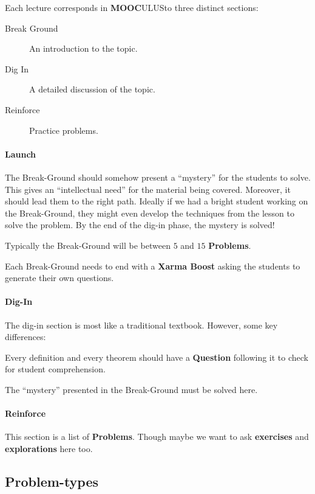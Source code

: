 \documentclass{article}
\newcommand{\mooculus}{\textsf{\textbf{MOOC}\textnormal{\textsf{ULUS}}}}
\begin{document}
Each lecture corresponds in \mooculus to three distinct sections:
\begin{description}
\item[Break Ground] An introduction to the topic.
\item[Dig In] A detailed discussion of the topic.
\item[Reinforce] Practice problems.
\end{description}

\paragraph{Launch}

The Break-Ground should somehow present a ``mystery'' for the students
to solve.  This gives an ``intellectual need'' for the material being
covered. Moreover, it should lead them to the right path. Ideally if
we had a bright student working on the Break-Ground, they might even develop
the techniques from the lesson to solve the problem.  By the end of
the dig-in phase, the mystery is solved!

Typically the Break-Ground will be between $5$ and $15$ \textbf{Problems}.

Each Break-Ground needs to end with a \textbf{Xarma Boost} asking the
students to generate their own questions.


\paragraph{Dig-In}


The dig-in section is most like a traditional textbook. However, some key differences:


Every definition and every theorem should have a \textbf{Question}
following it to check for student comprehension.


The ``mystery'' presented in the Break-Ground must be solved here. 



\paragraph{Reinforce}

This section is a list of \textbf{Problems}. Though maybe we want to
ask \textbf{exercises} and \textbf{explorations} here too.



\subsection*{Problem-types}
\end{document}
